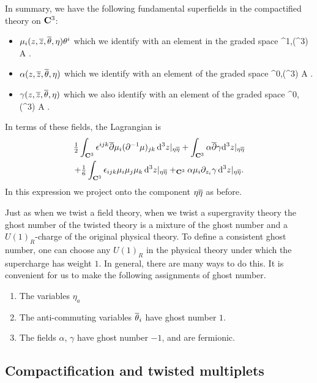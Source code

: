 \documentclass[../main.tex]{subfiles}
\begin{document}
In summary, we have the following fundamental superfields in the compactified theory on $\mathbf{C}^3$:
\begin{itemize}
\item $\mu_i (z,{\overline{z}},\overline{\theta}, \eta) \theta^i$ which we identify with an element in the graded space
\beqn
\mu \in \PV^{1,\bu}(\C^3) \otimes A .
\eeqn
\item $\alpha (z,{\overline{z}},\overline \theta, \eta)$ which we identify with an element of the graded space
\beqn
\alpha \in \Omega^{0,\bu}(\C^3) \otimes A .
\eeqn
\item $\gamma(z,{\overline{z}},\overline \theta, \eta)$ which we also identify with an element of the graded space
\beqn
\gamma \in \Omega^{0,\bu}(\C^3) \otimes A .
\eeqn
\end{itemize}
In terms of these fields, the Lagrangian is
\begin{multline} 
	\tfrac{1}{2}\int_{\mathbf{C}^{3}}   {\epsilon}^{ijk} \overline{\partial} \mu_{i} (\partial^{-1}  \mu)_{jk} \, \mathrm{d}^3 z |_{\eta \overline \eta}   + \int_{\mathbf{C}^{3}}  \alpha \overline{\partial} \gamma \mathrm{d}^3 z  |_{\eta \overline{\eta}} 
	\\
	+ \tfrac{1}{6} \int_{\mathbf{C}^{3}}  {\epsilon}_{ijk} \mu_{i}\mu_{j} \mu_{k} \, \mathrm{d}^3 z |_{\eta \overline{\eta}} + _{\mathbf{C}^{3}}  \alpha \mu_i \partial_{z_i}  \gamma \, \mathrm{d}^3 z|_{\eta \overline{\eta}} .
\end{multline} 
In this expression we project onto the component $\eta \overline \eta$ as before.

Just as when we twist a field theory, when we twist a supergravity theory the ghost number of the twisted theory  is a mixture of the ghost number and a $U(1)_R$-charge of the original physical theory. To define a consistent ghost number, one can choose any $U(1)_R$ in the physical theory under which the supercharge has weight $1$.  In general, there are many ways to do this.  It is convenient for us to make the following assignments of ghost number.
\begin{enumerate} 
	\item The variables $\eta_a$ 
	\item The anti-commuting variables $\overline{\theta}_i$ have ghost number $1$.
	\item The fields $\alpha$, $\gamma$ have ghost number $-1$, and are fermionic.
\end{enumerate}

\subsection{Compactification and twisted multiplets}
\end{document}
